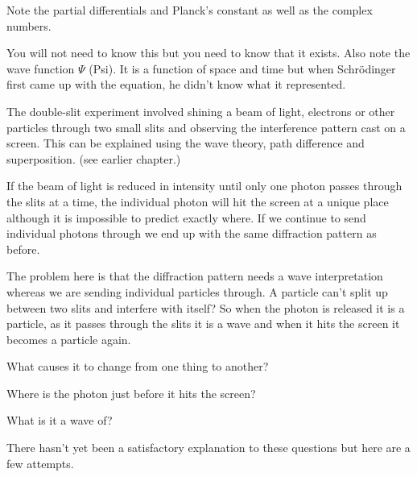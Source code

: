 \documentclass[main.tex]{subfiles}
\begin{document}
Note the partial differentials and Planck's constant as well as the complex numbers.

You will not need to know this but you need to know that it exists. Also note the wave function $\Psi$ (Psi). It is a function of space and time but when Schrödinger first came up with the equation, he didn't know what it represented.


The double-slit experiment involved shining a beam of light, electrons or other particles through two small slits and observing the interference pattern cast on a screen. This can be explained using the wave theory, path difference and superposition. (see earlier chapter.)

If the beam of light is reduced in intensity until only one photon passes through the slits at a time, the individual photon will hit the screen at a unique place although it is impossible to predict exactly where. If we continue to send individual photons through we end up with the same diffraction pattern as before.

The problem here is that the diffraction pattern needs a wave interpretation whereas we are sending individual particles through. A particle can't split up between two slits and interfere with itself? 
So when the photon is released it is a particle, as it passes through the slits it is a wave and when it hits the screen it becomes a particle again. 

What causes it to change from one thing to another?

Where is the photon just before it hits the screen?

What is it a wave of?

There hasn't yet been a satisfactory explanation to these questions but here are a few attempts.
\end{document}
